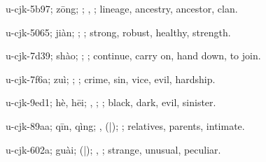 \begin{multicols}{2}
{\cjkgGlue{}u-cjk-5b97; zōng; \cjkgGlue{}; \cjkgGlue{}, \cjkgGlue{}; lineage, ancestry, ancestor, clan.

\cjkgGlue{}u-cjk-5065; jiàn; \cjkgGlue{}\cjkgGlue{}\cjkgGlue{}; \cjkgGlue{}; strong, robust, healthy, strength.

\cjkgGlue{}u-cjk-7d39; shào; \cjkgGlue{}; \cjkgGlue{}; continue, carry on, hand down, to join.

\cjkgGlue{}u-cjk-7f6a; zuì; \cjkgGlue{}; \cjkgGlue{}; crime, sin, vice, evil, hardship.

\cjkgGlue{}u-cjk-9ed1; hè, hēi; \cjkgGlue{}, \cjkgGlue{}; \cjkgGlue{}; black, dark, evil, sinister.

\cjkgGlue{}u-cjk-89aa; qīn, qìng; \cjkgGlue{}, \cjkgGlue{}\cjkgGlue{}(\cjkgGlue{}|\cjkgGlue{}); \cjkgGlue{}; relatives, parents, intimate.

\cjkgGlue{}u-cjk-602a; guài; \cjkgGlue{}\cjkgGlue{}(\cjkgGlue{}|\cjkgGlue{}); \cjkgGlue{}, \cjkgGlue{}; strange, unusual, peculiar.

}
\end{multicols}
